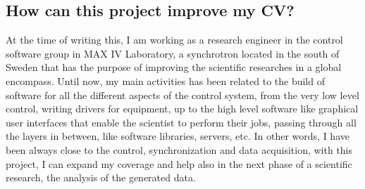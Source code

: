 \subsection{How can this project improve my CV?}
At the time of writing this, I am working as a research engineer in the control software group in MAX IV Laboratory, a synchrotron located in the south of Sweden that has the purpose of improving the scientific researches in a global encompass.
Until now, my main activities has been related to the build of software for all the different aspects of the control system, from the very low level control, writing drivers for equipment, up to the high level software like graphical user interfaces that enable the scientist to perform their jobs, passing through all the layers in between, like software libraries, servers, etc.
In other words, I have been always close to the control, synchronization and data acquisition, with this project, I can expand my coverage and help also in the next phase of a scientific research, the analysis of the generated data.
